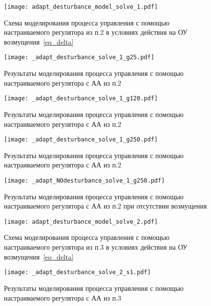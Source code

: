 \begin{figure}[h!]
	\centering
	\texttt{[image: adapt\_desturbance\_model\_solve\_1.pdf]}
	\caption{Схема моделирования процесса управления с помощью настраиваемого регулятора из п.2 в условиях действия на ОУ возмущения~\ref{eq_delta}}
	\label{img_schema_2}
\end{figure}

\begin{figure}[h!]
    \centering
    \texttt{[image: \_adapt\_desturbance\_solve\_1\_g25.pdf]}
    \caption{Результаты моделирования процесса управления с помощью настраиваемого регулятора с АА из п.2}
    \label{img_aa_2_g25}
\end{figure}

\begin{figure}[h!]
	\centering
	\texttt{[image: \_adapt\_desturbance\_solve\_1\_g120.pdf]}
	\caption{Результаты моделирования процесса управления с помощью настраиваемого регулятора с АА из п.2}
	\label{img_aa_2_g120}
\end{figure}

\begin{figure}[h!]
	\centering
	\texttt{[image: \_adapt\_desturbance\_solve\_1\_g250.pdf]}
	\caption{Результаты моделирования процесса управления с помощью настраиваемого регулятора с АА из п.2}
	\label{img_aa_2_g250}
\end{figure}

\begin{figure}[h!]
	\centering
	\texttt{[image: \_adapt\_NOdesturbance\_solve\_1\_g250.pdf]}
	\caption{Результаты моделирования процесса управления с помощью настраиваемого регулятора с АА из п.2 при отсутствии возмущения}
	\label{img_aa_2_g250_nodesturbance}
\end{figure}

\begin{figure}[h!]
	\centering
	\texttt{[image: adapt\_desturbance\_model\_solve\_2.pdf]}
	\caption{Схема моделирования процесса управления с помощью настраиваемого регулятора из п.3 в условиях действия на ОУ возмущения~\ref{eq_delta}}
	\label{img_schema_3}
\end{figure}

\begin{figure}[h!]
	\centering
	\texttt{[image: \_adapt\_desturbance\_solve\_2\_s1.pdf]}
	\caption{Результаты моделирования процесса управления с помощью настраиваемого регулятора с АА из п.3}
	\label{img_aa_3_s1}
\end{figure}


